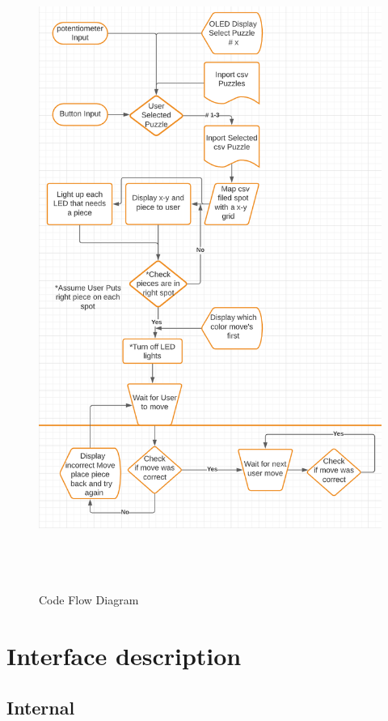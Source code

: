 \documentclass[11pt]{article}
\begin{document}
\begin{center}
\begin{figure}
  \includegraphics[width=17cm,height=21cm]{./Pics/Code_Flow_Diagram.PNG}
  \caption{Code Flow Diagram}
  \label{fig:CFD1}
\end{figure}
\end{center}

\section{Interface description}
\subsection{Internal}
\end{document}

